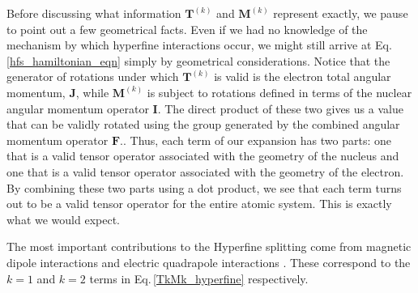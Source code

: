 Before discussing what information $\mathbf{T}^{(k)}$ and $\mathbf{M}^{(k)}$ represent exactly,
we pause to point out a few geometrical facts. Even if we had no knowledge of the mechanism by which hyperfine interactions occur, we might still arrive at Eq.\,\ref{hfs_hamiltonian_eqn} simply by geometrical considerations.
Notice that the generator of rotations under which $\mathbf{T}^{(k)}$ is valid is the electron total angular momentum, $\mathbf{J}$, while $\mathbf{M}^{(k)}$ is subject to rotations defined in terms of the nuclear angular momentum operator $\mathbf{I}$. 
The direct product of these two gives us a value that can be validly rotated using the group generated by the combined angular momentum operator $\mathbf{F}$.\cite{Racah2}\cite{sobelman_spectra}. Thus, each term of our expansion has two parts: one that is a valid tensor operator associated with the geometry of the nucleus and one that is a valid tensor operator associated with the geometry of the electron. By combining these two parts using a dot product, we see that each term turns out to be a valid tensor operator for the entire atomic system. This is exactly what we would expect.

The most important contributions to the Hyperfine splitting come from magnetic dipole interactions and electric quadrapole interactions \cite{sobelman_spectra,schwartz_hyperfine_expansion,cuaMITnotes}. These correspond to the $k=1$ and $k=2$ terms in Eq.\,\eqref{TkMk_hyperfine} respectively\cite{experimental_hyperfine_alkali_arimondo}.
